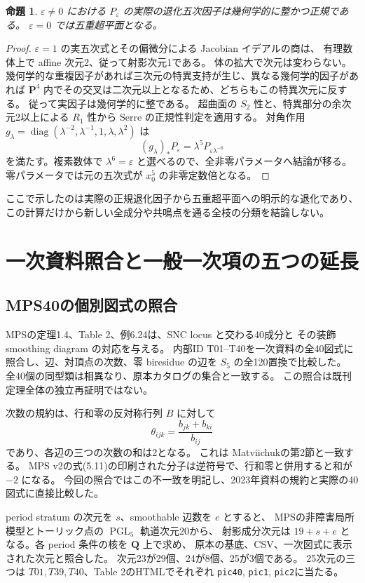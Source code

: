 \documentclass[11pt,a4paper]{ltjsarticle}
\newcommand{\QQ}{\mathbf Q}
\newcommand{\PP}{\mathbf P}
\DeclareMathOperator{\PGL}{PGL}
\newtheorem{proposition}[theorem]{命題}
\theoremstyle{remark}
\begin{document}
\begin{proposition}
$\varepsilon\ne0$ における $P_\varepsilon$ の実際の退化五次因子は幾何学的に整かつ正規である。
$\varepsilon=0$ では五重超平面となる。
\end{proposition}
\begin{proof}
$\varepsilon=1$ の実五次式とその偏微分による Jacobian イデアルの商は、
有理数体上で affine 次元2、従って射影次元1である\cite{resonant-normal-v62}。
体の拡大で次元は変わらない。
幾何学的な重複因子があれば三次元の特異支持が生じ、異なる幾何学的因子があれば
$\PP^4$ 内でその交叉は二次元以上となるため、どちらもこの特異次元に反する。
従って実因子は幾何学的に整である。
超曲面の $S_2$ 性と、特異部分の余次元2以上による $R_1$ 性から Serre の正規性判定を適用する。
対角作用 $g_\lambda=\operatorname{diag}(\lambda^{-2},\lambda^{-1},1,\lambda,\lambda^2)$ は
\[
 (g_\lambda)_*P_\varepsilon=\lambda^5P_{\varepsilon\lambda^{-6}}
\]
を満たす。複素数体で $\lambda^6=\varepsilon$ と選べるので、全非零パラメータへ結論が移る。
零パラメータでは元の五次式が $x_0^5$ の非零定数倍となる。
\end{proof}
ここで示したのは実際の正規退化因子から五重超平面への明示的な退化であり、
この計算だけから新しい全成分や共鳴点を通る全枝の分類を結論しない。

\section{一次資料照合と一般一次項の五つの延長}\label{sec:five-lifts}
\subsection{MPS40の個別図式の照合}
MPS\cite{mps}の定理1.4、Table 2、例6.24は、SNC locus と交わる40成分と
その装飾 smoothing diagram の対応を与える。
内部ID T01--T40を一次資料の全40図式に照合し、辺、対頂点の次数、零 biresidue の辺を
$S_5$ の全120置換で比較した\cite{mps-crosswalk}。
全40個の同型類は相異なり、原本カタログの集合と一致する。
この照合は既刊定理全体の独立再証明ではない。

次数の規約は、行和零の反対称行列 $B$ に対して
\[
 \theta_{ijk}=\frac{b_{jk}+b_{ki}}{b_{ij}}
\]
であり、各辺の三つの次数の和は2となる。
これは Matviichuk\cite{matviichuk}の第2節と一致する。
MPS v2の式(5.11)の印刷された分子は逆符号で、行和零と併用すると和が $-2$ になる。
今回の照合ではこの不一致を明記し、2023年資料の規約と実際の40図式に直接比較した。

period stratum の次元を $s$、smoothable 辺数を $e$ とすると、
MPSの非障害局所模型とトーリック点の $\PGL_5$ 軌道次元20から、
射影成分次元は $19+s+e$ となる。各 period 条件の核を $\QQ$ 上で求め、
原本の基底、CSV、一次図式に表示された次元と照合した。
次元23が29個、24が8個、25が3個である。
25次元の三つは $T01,T39,T40$、Table 2のHTMLでそれぞれ
\texttt{pic40}, \texttt{pic1}, \texttt{pic2}に当たる。
\end{document}
